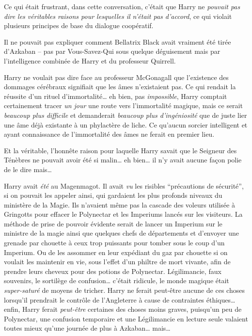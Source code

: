 \later

Ce qui était frustrant, dans cette conversation, c'était que Harry ne \emph{pouvait pas dire les véritables raisons pour lesquelles il n'était pas d'accord}, ce qui violait plusieurs principes de base du dialogue coopératif.

Il ne pouvait pas expliquer comment Bellatrix Black avait vraiment été tirée d'Azkaban -- pas par Vous-Savez-Qui sous quelque déguisement mais par l'intelligence combinée de Harry et du professeur Quirrell.

Harry ne voulait pas dire face au professeur McGonagall que l'existence des dommages cérébraux signifiait que les âmes n'existaient pas.
Ce qui rendait la réussite d'un rituel d'immortalité… eh bien, pas \emph{impossible}, Harry comptait certainement tracer \emph{un jour} une route vers l'immortalité magique, mais ce serait \emph{beaucoup plus difficile} et demanderait \emph{beaucoup plus d'ingéniosité} que de juste lier une âme déjà existante à un phylactère de liche.
Ce qu'aucun sorcier intelligent et ayant connaissance de l'immortalité des âmes ne ferait en premier lieu.

Et la véritable, l'honnête raison pour laquelle Harry savait que le Seigneur des Ténèbres ne pouvait avoir été si malin… eh bien… il n'y avait aucune façon polie de le dire mais…

Harry avait \emph{été} au Magenmagot.
Il avait \emph{vu} les risibles “précautions de sécurité”, si on pouvait les appeler ainsi, qui gardaient les plus profonds niveaux du ministère de la Magie.
Ils n'avaient même pas la cascade des voleurs utilisée à Gringotts pour effacer le Polynectar et les Imperiums lancés sur les visiteurs.
La méthode de prise de pouvoir évidente serait de lancer un Imperium sur le ministre de la magie ainsi que quelques chefs de départements et d'envoyer une grenade par chouette à ceux trop puissants pour tomber sous le coup d'un Imperium.
Ou de les assommer en leur expédiant du gaz par chouette si on voulait les maintenir en vie, sous l'effet d'un philtre de mort vivante, afin de prendre leurs cheveux pour des potions de Polynectar.
Légilimancie, faux souvenirs, le sortilège de confusion… c'était ridicule, le monde magique était \emph{super-saturé} de moyens de tricher.
Harry ne ferait peut-être aucune de ces choses lorsqu'il prendrait le contrôle de l'Angleterre à cause de contraintes éthiques… enfin, Harry ferait \emph{peut-être} certaines des choses moins graves, puisqu'un peu de Polynectar, une confusion temporaire et une Légilimancie en lecture seule valaient toutes mieux qu'une journée de plus à Azkaban… mais…


